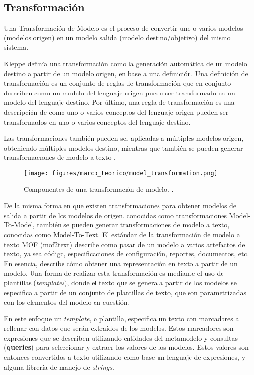 \subsection{Transformación}
Una Transformación de Modelo es el proceso de convertir uno o varios modelos (modelos origen) en un modelo salida (modelo destino/objetivo) del mismo sistema.

Kleppe \cite{kleppe2003mda} definía una transformación como la generación automática de un modelo destino a partir de un modelo origen, en base a una definición. Una definición de transformación es un conjunto de reglas de transformación que en conjunto describen como un modelo del lenguaje origen puede ser transformado en un modelo del lenguaje destino. Por último, una regla de transformación es una descripción de como uno o varios conceptos del lenguaje origen pueden ser transformados en uno o varios conceptos del lenguaje destino.

Las transformaciones también pueden ser aplicadas a múltiples modelos origen, obteniendo múltiples modelos destino, mientras que también se pueden generar transformaciones de modelo a texto \cite{mens2006taxonomy}.

\begin{figure}[htbp]
    \centering
    \texttt{[image: figures/marco\_teorico/model\_transformation.png]}
    \caption{Componentes de una transformación de modelo. \cite{biehl2010literature}.}
    \label{fig:marco:transformation}
\end{figure}

De la misma forma en que existen transformaciones para obtener modelos de salida a partir de los modelos de origen, conocidas como transformaciones Model-To-Model, también se pueden generar transformaciones de modelo a texto, conocidas como Model-To-Text. El estándar de la transformación de modelo a texto MOF (mof2text) describe como pasar de un modelo a varios artefactos de texto, ya sea código, especificaciones de configuración, reportes, documentos, etc. En esencia, describe cómo obtener una representación en texto a partir de un modelo. Una forma de realizar esta transformación es mediante el uso de plantillas (\textit{templates}), donde el texto que se genera a partir de los modelos se especifica a partir de un conjunto de plantillas de texto, que son parametrizadas con los elementos del modelo en cuestión.

En este enfoque un \textit{template}, o plantilla, especifica un texto con marcadores a rellenar con datos que serán extraídos de los modelos. Estos marcadores son expresiones que se describen utilizando entidades del metamodelo y consultas (\textbf{queries}) para seleccionar y extraer los valores de los modelos. Estos valores son entonces convertidos a texto utilizando como base un lenguaje de expresiones, y alguna librería de manejo de \textit{strings}. \cite{mof_model2text}

